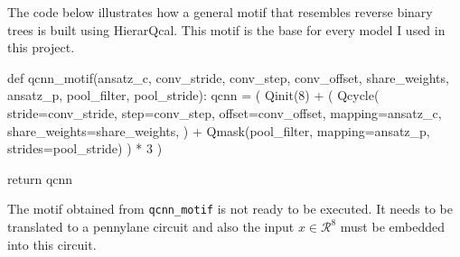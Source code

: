 \documentclass[
  13pt,
  a4paper,
  DIV=11,
  numbers=noendperiod]{scrreprt}
\newenvironment{Shaded}{\begin{snugshade}}{\end{snugshade}}
\newcommand{\ControlFlowTok}[1]{\textcolor[rgb]{0.00,0.23,0.31}{#1}}
\newcommand{\DecValTok}[1]{\textcolor[rgb]{0.68,0.00,0.00}{#1}}
\newcommand{\KeywordTok}[1]{\textcolor[rgb]{0.00,0.23,0.31}{#1}}
\newcommand{\NormalTok}[1]{\textcolor[rgb]{0.00,0.23,0.31}{#1}}
\newcommand{\OperatorTok}[1]{\textcolor[rgb]{0.37,0.37,0.37}{#1}}
\begin{document}
The code below illustrates how a general motif that resembles reverse
binary trees is built using HierarQcal. This motif is the base for every
model I used in this project.

\begin{Shaded}
\begin{Highlighting}[numbers=left,,]
\KeywordTok{def}\NormalTok{ qcnn\_motif(ansatz\_c, conv\_stride, conv\_step, conv\_offset, share\_weights, ansatz\_p, pool\_filter, pool\_stride):}
\NormalTok{    qcnn }\OperatorTok{=}\NormalTok{ (}
\NormalTok{        Qinit(}\DecValTok{8}\NormalTok{)}
        \OperatorTok{+}\NormalTok{ (}
\NormalTok{            Qcycle(}
\NormalTok{                stride}\OperatorTok{=}\NormalTok{conv\_stride,}
\NormalTok{                step}\OperatorTok{=}\NormalTok{conv\_step,}
\NormalTok{                offset}\OperatorTok{=}\NormalTok{conv\_offset,}
\NormalTok{                mapping}\OperatorTok{=}\NormalTok{ansatz\_c,}
\NormalTok{                share\_weights}\OperatorTok{=}\NormalTok{share\_weights,}
\NormalTok{            )}
            \OperatorTok{+}\NormalTok{ Qmask(pool\_filter, mapping}\OperatorTok{=}\NormalTok{ansatz\_p, strides}\OperatorTok{=}\NormalTok{pool\_stride)}
\NormalTok{        )}
        \OperatorTok{*} \DecValTok{3}
\NormalTok{    )}

    \ControlFlowTok{return}\NormalTok{ qcnn}
\end{Highlighting}
\end{Shaded}

The motif obtained from \texttt{qcnn\_motif} is not ready to be
executed. It needs to be translated to a pennylane circuit and also the
input \(x \in \mathcal{R}^8\) must be embedded into this circuit.
\end{document}
